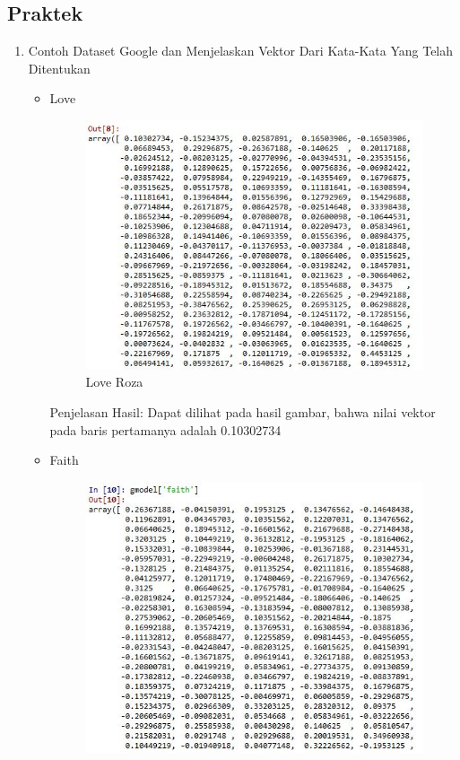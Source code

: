 \subsection{Praktek}
\begin{enumerate}
\item Contoh Dataset Google dan Menjelaskan Vektor  Dari Kata-Kata Yang Telah Ditentukan
\par
\begin{itemize}
\item Love
\begin{figure}[!hbtp]
\centering
\includegraphics[scale=0.6]{figures/loveroza.jpg}
\caption{Love Roza}
\label{text-fadila}
\end{figure}
\par Penjelasan Hasil: Dapat dilihat pada hasil gambar, bahwa nilai vektor pada baris pertamanya adalah 0.10302734
\par
\item Faith
\begin{figure}[!hbtp]
\centering
\includegraphics[scale=0.6]{figures/faithroza.jpg}

\end{figure}
\end{itemize}
\end{enumerate}
